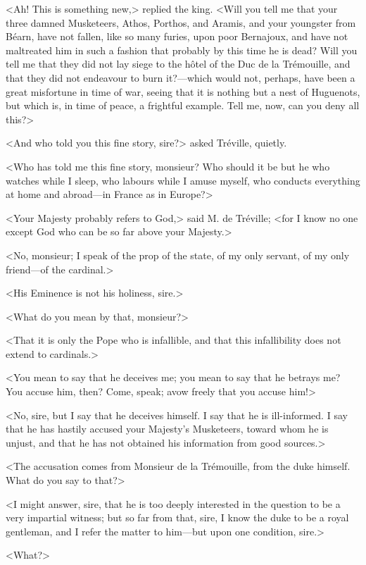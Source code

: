 <Ah! This is something new,> replied the king. <Will you tell me that your three damned Musketeers, Athos, Porthos, and Aramis, and your youngster from Béarn, have not fallen, like so many furies, upon poor Bernajoux, and have not maltreated him in such a fashion that probably by this time he is dead? Will you tell me that they did not lay siege to the hôtel of the Duc de la Trémouille, and that they did not endeavour to burn it?---which would not, perhaps, have been a great misfortune in time of war, seeing that it is nothing but a nest of Huguenots, but which is, in time of peace, a frightful example. Tell me, now, can you deny all this?> 

<And who told you this fine story, sire?> asked Tréville, quietly. 

<Who has told me this fine story, monsieur? Who should it be but he who watches while I sleep, who labours while I amuse myself, who conducts everything at home and abroad---in France as in Europe?> 

<Your Majesty probably refers to God,> said M. de Tréville; <for I know no one except God who can be so far above your Majesty.> 

<No, monsieur; I speak of the prop of the state, of my only servant, of my only friend---of the cardinal.> 

<His Eminence is not his holiness, sire.> 

<What do you mean by that, monsieur?> 

<That it is only the Pope who is infallible, and that this infallibility does not extend to cardinals.> 

<You mean to say that he deceives me; you mean to say that he betrays me? You accuse him, then? Come, speak; avow freely that you accuse him!> 

<No, sire, but I say that he deceives himself. I say that he is ill-informed. I say that he has hastily accused your Majesty's Musketeers, toward whom he is unjust, and that he has not obtained his information from good sources.> 

<The accusation comes from Monsieur de la Trémouille, from the duke himself. What do you say to that?> 

<I might answer, sire, that he is too deeply interested in the question to be a very impartial witness; but so far from that, sire, I know the duke to be a royal gentleman, and I refer the matter to him---but upon one condition, sire.> 

<What?> 

